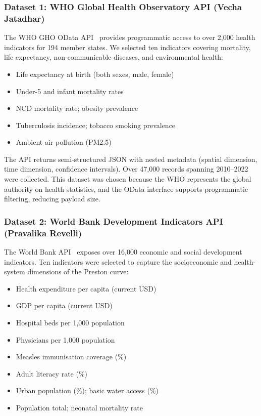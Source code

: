 \documentclass[conference]{IEEEtran}
\begin{document}
\subsubsection{Dataset 1: WHO Global Health Observatory API (Vecha Jatadhar)}
The WHO GHO OData API~\cite{whogho} provides programmatic access to over 2,000
health indicators for 194 member states. We selected ten indicators covering
mortality, life expectancy, non-communicable diseases, and environmental
health:

\begin{itemize}
  \item Life expectancy at birth (both sexes, male, female)
  \item Under-5 and infant mortality rates
  \item NCD mortality rate; obesity prevalence
  \item Tuberculosis incidence; tobacco smoking prevalence
  \item Ambient air pollution (PM2.5)
\end{itemize}

The API returns semi-structured JSON with nested metadata (spatial dimension,
time dimension, confidence intervals). Over 47,000 records spanning 2010--2022
were collected. This dataset was chosen because the WHO represents the global
authority on health statistics, and the OData interface supports programmatic
filtering, reducing payload size.

\subsubsection{Dataset 2: World Bank Development Indicators API (Pravalika Revelli)}
The World Bank API~\cite{worldbankapi} exposes over 16,000 economic and social
development indicators. Ten indicators were selected to capture the
socioeconomic and health-system dimensions of the Preston curve:

\begin{itemize}
  \item Health expenditure per capita (current USD)
  \item GDP per capita (current USD)
  \item Hospital beds per 1,000 population
  \item Physicians per 1,000 population
  \item Measles immunisation coverage (\%)
  \item Adult literacy rate (\%)
  \item Urban population (\%); basic water access (\%)
  \item Population total; neonatal mortality rate
\end{itemize}
\end{document}
